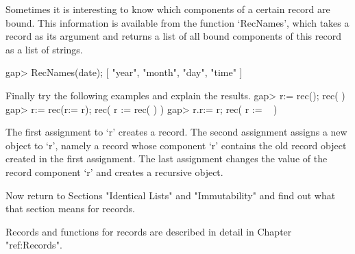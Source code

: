 Sometimes it is interesting to know which  components of a certain record
are  bound.  This information is available  from the function `RecNames',
which  takes a record as  its  argument and  returns  a list of all bound
components of this record as a list of strings.

\beginexample
    gap> RecNames(date);
    [ "year", "month", "day", "time" ]
\endexample

\exercise Finally try the following examples and explain the results.
\beginexample
    gap> r:= rec();
    rec(
       )
    gap> r:= rec(r:= r);
    rec(
      r := rec(
           ) )
    gap> r.r:= r;
    rec(
      r := ~ )
\endexample

\answer  The  first  assignment to `r'    creates a  record.   The second
assignment assigns a  new object to `r', namely  a record whose component
`r' contains the old record object created  in the first assignment.  The
last assignment changes the value of the record component `r' and creates
a recursive object.


Now return to Sections "Identical Lists"  and "Immutability" and find out
what that section means for records.

Records and functions  for records are  described in  detail  in  Chapter
"ref:Records".

